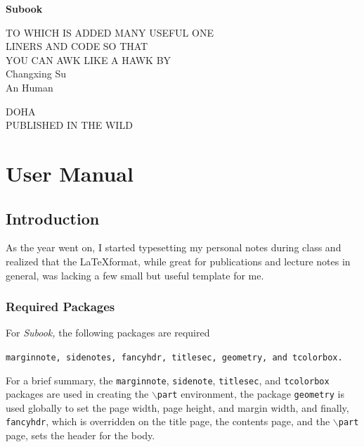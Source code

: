 \documentclass[]{subook}
\begin{document}
\pagestyle{empty}
\setcounter{page}{0}



\begin{center}
\bfseries
\nbvspace[1]
\Huge
{\nbtitlestretch\huge
Subook}

\nbvspace[1]
\normalsize

TO WHICH IS ADDED MANY USEFUL ONE\\
LINERS AND CODE SO THAT\\
YOU CAN AWK LIKE A HAWK
\nbvspace[1]
\small BY\\
\Large Changxing Su\\[0.5em]
\footnotesize An Human 

\nbvspace[2]

\nbvspace[3]
\normalsize

DOHA\\
\large
PUBLISHED IN THE WILD
\nbvspace[1]
\end{center}

\dominitoc%
\newpage

\tableofcontents %
\restoregeometry

\pagestyle{fancy} %
\part{User Manual}

\chapter{Introduction}
\minitoc
As the year went on, I started typesetting my personal notes during class and realized that the \LaTeX  format, 
while great for publications and lecture notes in general, was lacking a few small but useful template for me.

\section{Required Packages}\label{sec:reqpackages}
For \textit{Subook,} the following packages are required
\begin{center}
    \texttt{marginnote, sidenotes, fancyhdr, titlesec, geometry, and tcolorbox.}
\end{center}
For a brief summary, the \texttt{marginnote}, \texttt{sidenote}, \texttt{titlesec}, 
and \texttt{tcolorbox} packages are used in creating the \texttt{$\backslash$part} environment, 
the package \texttt{geometry} is used globally to set the page width, page height, 
and margin width, and finally, \texttt{fancyhdr}, 
which is overridden on the title page, 
the contents page, and the \texttt{$\backslash$part} page, sets the header for the body.
\end{document}
